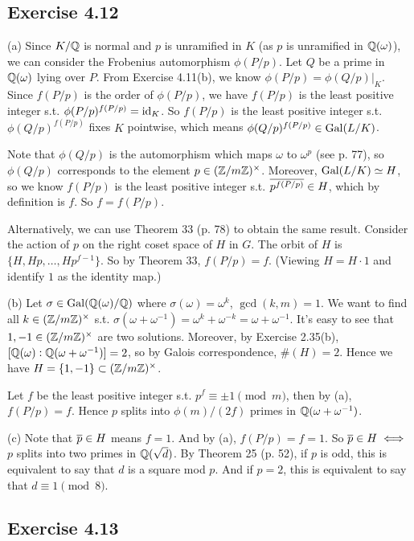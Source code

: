 \documentclass[../Marcus.tex]{subfiles}
\begin{document}
\subsection*{Exercise 4.12}

(a) Since $K/\mathbb{Q}$ is normal and $p$ is unramified in $K$ (as $p$ is unramified in $\mathbb{Q}(\omega)$), we can consider the Frobenius automorphism $\phi(P/p)$. Let $Q$ be a prime in $\mathbb{Q}(\omega)$ lying over $P$. From Exercise 4.11(b), we know $\phi(P/p)=\phi(Q/p)|_K$. Since $f(P/p)$ is the order of $\phi(P/p)$, we have $f(P/p)$ is the least positive integer s.t. $\phi(P/p)^{f(P/p)}=\operatorname{id}_K$. So $f(P/p)$ is the least positive integer s.t. $\phi(Q/p)^{f(P/p)}$ fixes $K$ pointwise, which means $\phi(Q/p)^{f(P/p)}\in\operatorname{Gal}(L/K)$.

Note that $\phi(Q/p)$ is the automorphism which maps $\omega$ to $\omega^p$ (see p. 77), so $\phi(Q/p)$ corresponds to the element $p\in(\mathbb{Z}/m\mathbb{Z})^\times$. Moreover, $\operatorname{Gal}(L/K)\simeq H$, so we know $f(P/p)$ is the least positive integer s.t. $\overline{p^{f(P/p)}}\in H$, which by definition is $f$. So $f=f(P/p)$.

Alternatively, we can use Theorem 33 (p. 78) to obtain the same result. Consider the action of $p$ on the right coset space of $H$ in $G$. The orbit of $H$ is $\{H,Hp,\ldots,Hp^{f-1}\}$. So by Theorem 33, $f(P/p)=f$. (Viewing $H=H\cdot 1$ and identify $1$ as the identity map.)

(b) Let $\sigma\in\operatorname{Gal}(\mathbb{Q}(\omega)/\mathbb{Q})$ where $\sigma(\omega)=\omega^k$, $\gcd(k,m)=1$. We want to find all $k\in(\mathbb{Z}/m\mathbb{Z})^\times$ s.t. $\sigma(\omega+\omega^{-1})=\omega^k+\omega^{-k}=\omega+\omega^{-1}$. It's easy to see that $1,-1\in(\mathbb{Z}/m\mathbb{Z})^\times$ are two solutions. Moreover, by Exercise 2.35(b), $[\mathbb{Q}(\omega):\mathbb{Q}(\omega+\omega^{-1})]=2$, so by Galois correspondence, $\#(H)=2$. Hence we have $H=\{1,-1\}\subset(\mathbb{Z}/m\mathbb{Z})^\times$.

Let $f$ be the least positive integer s.t. $p^f \equiv \pm1\pmod{m}$, then by (a), $f(P/p)=f$. Hence $p$ splits into $\phi(m)/(2f)$ primes in $\mathbb{Q}(\omega+\omega^{-1})$.

(c) Note that $\overline{p}\in H$ means $f=1$. And by (a), $f(P/p)=f=1$. So $\overline{p}\in H \iff$ $p$ splits into two primes in $\mathbb{Q}(\sqrt{d})$. By Theorem 25 (p. 52), if $p$ is odd, this is equivalent to say that $d$ is a square mod $p$. And if $p=2$, this is equivalent to say that $d\equiv 1\pmod{8}$.

\subsection*{Exercise 4.13}
\end{document}
